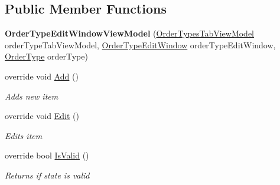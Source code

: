\subsection*{Public Member Functions}
\begin{DoxyCompactItemize}
\item 
\hypertarget{class_baudi_1_1_client_1_1_view_models_1_1_edit_window_view_models_1_1_order_type_edit_window_view_model_a61c57bb3ab547d202b22bef526156efd}{}{\bfseries Order\+Type\+Edit\+Window\+View\+Model} (\hyperlink{class_baudi_1_1_client_1_1_view_models_1_1_tabs_view_models_1_1_order_types_tab_view_model}{Order\+Types\+Tab\+View\+Model} order\+Type\+Tab\+View\+Model, \hyperlink{class_baudi_1_1_client_1_1_view_1_1_edit_windows_1_1_order_type_edit_window}{Order\+Type\+Edit\+Window} order\+Type\+Edit\+Window, \hyperlink{class_baudi_1_1_d_a_l_1_1_models_1_1_order_type}{Order\+Type} order\+Type)\label{class_baudi_1_1_client_1_1_view_models_1_1_edit_window_view_models_1_1_order_type_edit_window_view_model_a61c57bb3ab547d202b22bef526156efd}

\item 
override void \hyperlink{class_baudi_1_1_client_1_1_view_models_1_1_edit_window_view_models_1_1_order_type_edit_window_view_model_aba314a8c4a3479ecdf64321b79641f00}{Add} ()
\begin{DoxyCompactList}\small\item\em Adds new item \end{DoxyCompactList}\item 
override void \hyperlink{class_baudi_1_1_client_1_1_view_models_1_1_edit_window_view_models_1_1_order_type_edit_window_view_model_a394d146b8591d596037c0aef911c1d07}{Edit} ()
\begin{DoxyCompactList}\small\item\em Edits item \end{DoxyCompactList}\item 
override bool \hyperlink{class_baudi_1_1_client_1_1_view_models_1_1_edit_window_view_models_1_1_order_type_edit_window_view_model_a48e5d33ce4f04d3cef96b3c63ef1409a}{Is\+Valid} ()
\begin{DoxyCompactList}\small\item\em Returns if state is valid \end{DoxyCompactList}\end{DoxyCompactItemize}

